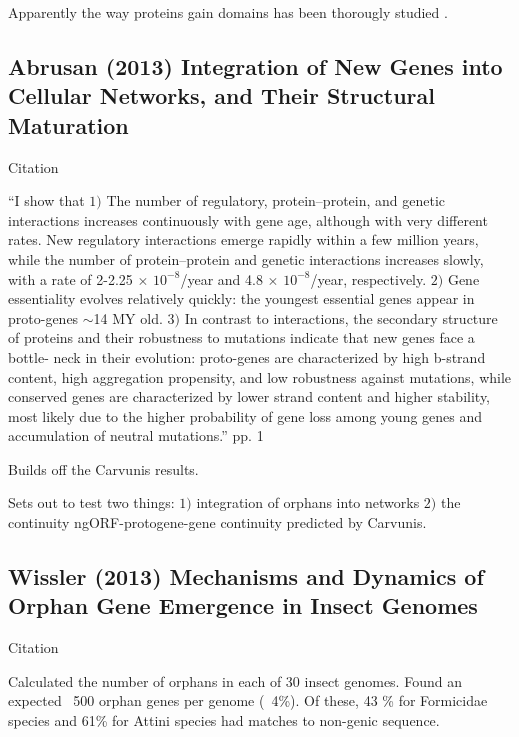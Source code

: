     Apparently the way proteins gain domains has been thorougly studied
    \cite{chothia_evolution_2003, vogel_structure_2004,
    ekman_multi-domain_2005, moore_arrangements_2008,
    buljan_evolution_2009, marsh_how_2010, moore_dynamics_2011,
    ekman_quantification_2007}.

\subsection{Abrusan (2013) Integration of New Genes into Cellular Networks,
    and Their Structural Maturation} 

    Citation \cite{abrusan_integration_2013}

    ``I show that $1)$ The number of regulatory, protein–protein, and
    genetic interactions increases continuously with gene age, although
    with very different rates. New regulatory interactions emerge rapidly
    within a few million years, while the number of protein–protein and
    genetic interactions increases slowly, with a rate of 2-2.25 $\times$
    $10^{-8}$/year and 4.8 $\times$ $10^{-8}$/year, respectively. $2)$ Gene
    essentiality evolves relatively quickly: the youngest essential genes
    appear in proto-genes $\sim$14 MY old. $3)$ In contrast to
    interactions, the secondary structure of proteins and their robustness
    to mutations indicate that new genes face a bottle- neck in their
    evolution: proto-genes are characterized by high b-strand content, high
    aggregation propensity, and low robustness against mutations, while
    conserved genes are characterized by lower strand content and higher
    stability, most likely due to the higher probability of gene loss among
    young genes and accumulation of neutral mutations.'' pp. 1

    Builds off the Carvunis results.

    Sets out to test two things: $1)$ integration of orphans into networks
    $2)$ the continuity ngORF-protogene-gene continuity predicted by
    Carvunis.

\subsection{Wissler (2013) Mechanisms and Dynamics of Orphan Gene Emergence
in Insect Genomes} 

    Citation \cite{wissler_mechanisms_2013}

    Calculated the number of orphans in each of 30 insect genomes. Found an
    expected ~500 orphan genes per genome (~4\%). Of these, 43 \% for
    Formicidae species and 61\% for Attini species had matches to non-genic
    sequence.


